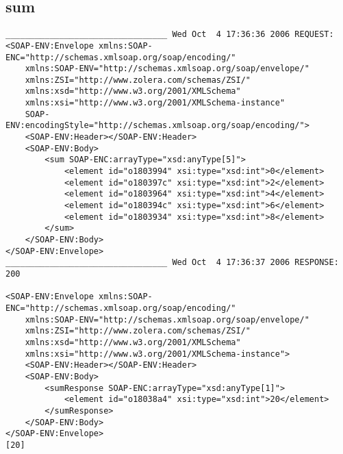 \subsection{sum}
\begin{verbatim}
_________________________________ Wed Oct  4 17:36:36 2006 REQUEST:
<SOAP-ENV:Envelope xmlns:SOAP-ENC="http://schemas.xmlsoap.org/soap/encoding/" 
	xmlns:SOAP-ENV="http://schemas.xmlsoap.org/soap/envelope/" 
	xmlns:ZSI="http://www.zolera.com/schemas/ZSI/" 
	xmlns:xsd="http://www.w3.org/2001/XMLSchema" 
	xmlns:xsi="http://www.w3.org/2001/XMLSchema-instance" 
	SOAP-ENV:encodingStyle="http://schemas.xmlsoap.org/soap/encoding/">
	<SOAP-ENV:Header></SOAP-ENV:Header>
	<SOAP-ENV:Body>
		<sum SOAP-ENC:arrayType="xsd:anyType[5]">
			<element id="o1803994" xsi:type="xsd:int">0</element>
			<element id="o180397c" xsi:type="xsd:int">2</element>
			<element id="o1803964" xsi:type="xsd:int">4</element>
			<element id="o180394c" xsi:type="xsd:int">6</element>
			<element id="o1803934" xsi:type="xsd:int">8</element>
		</sum>
	</SOAP-ENV:Body>
</SOAP-ENV:Envelope>
_________________________________ Wed Oct  4 17:36:37 2006 RESPONSE:
200

<SOAP-ENV:Envelope xmlns:SOAP-ENC="http://schemas.xmlsoap.org/soap/encoding/" 
	xmlns:SOAP-ENV="http://schemas.xmlsoap.org/soap/envelope/" 
	xmlns:ZSI="http://www.zolera.com/schemas/ZSI/" 
	xmlns:xsd="http://www.w3.org/2001/XMLSchema" 
	xmlns:xsi="http://www.w3.org/2001/XMLSchema-instance">
	<SOAP-ENV:Header></SOAP-ENV:Header>
	<SOAP-ENV:Body>
		<sumResponse SOAP-ENC:arrayType="xsd:anyType[1]">
			<element id="o18038a4" xsi:type="xsd:int">20</element>
		</sumResponse>
	</SOAP-ENV:Body>
</SOAP-ENV:Envelope>
[20]
\end{verbatim}

